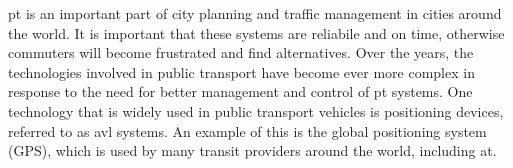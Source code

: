 \documentclass[12pt,a4paper]{article}
\begin{document}













\Gls{pt} is an important part of city planning and traffic management in cities around the world.
It is important that these systems are reliabile and on time,
otherwise commuters will become frustrated and find alternatives.
Over the years, the technologies involved in public transport have become ever more complex
in response to the need for better management and control of \gls{pt} systems.
One technology that is widely used in public transport vehicles is positioning devices,
referred to as \gls{avl} systems.
An example of this is the global positioning system (GPS),
which is used by many transit providers around the world, including \gls{at}.
\end{document}
